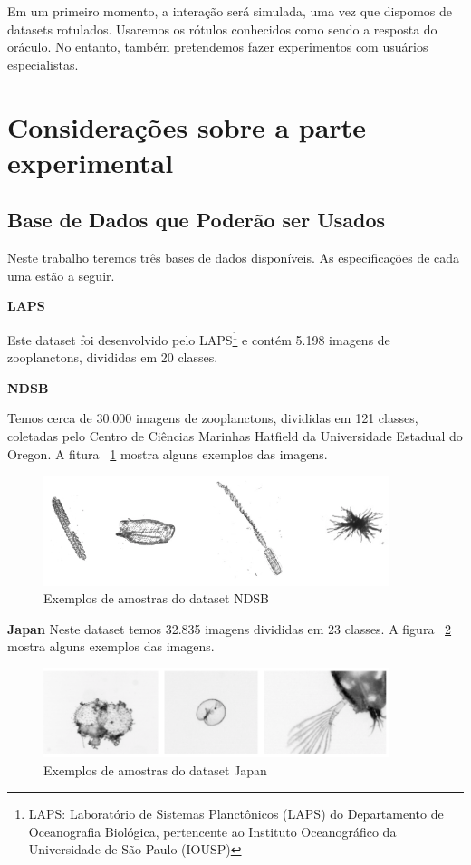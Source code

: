 Em um primeiro momento, a interação será simulada, uma vez que dispomos de datasets rotulados. Usaremos os rótulos conhecidos como sendo a resposta do oráculo. No entanto, também pretendemos fazer experimentos com usuários especialistas.

\section{Considerações sobre a parte experimental}
\label{sec:consideracoes_parte_experimental}


\subsection{Base de Dados que Poderão ser Usados} 
\label{sec:base_usadas}

Neste trabalho teremos três bases de dados disponíveis. As especificações de cada uma estão a seguir.

\textbf{LAPS}

Este dataset foi desenvolvido pelo LAPS\footnote{LAPS: Laboratório de Sistemas Planctônicos (LAPS) do Departamento de Oceanografia Biológica, pertencente ao Instituto Oceanográfico da Universidade de São Paulo (IOUSP)} e contém 5.198 imagens de zooplanctons, divididas em 20 classes.

\textbf{NDSB}

Temos cerca de 30.000 imagens de zooplanctons, divididas em 121 classes, coletadas pelo Centro de Ciências Marinhas Hatfield da Universidade Estadual do Oregon. A fitura ~\ref{fig:ndsb} mostra alguns exemplos das imagens.

\begin{figure}
  \centering
  \includegraphics[width=0.9\textwidth]{figures/ndsb_exemplos.png}
  \caption{Exemplos de amostras do dataset NDSB}
  \label{fig:ndsb}
\end{figure}

\textbf{Japan}
Neste dataset temos 32.835 imagens divididas em 23 classes. A figura ~\ref{fig:japan} mostra alguns exemplos das imagens.


\begin{figure}
  \centering
  \includegraphics[width=0.9\textwidth]{figures/japan_exemplos.png}
  \caption{Exemplos de amostras do dataset Japan}
  \label{fig:japan}
\end{figure}




